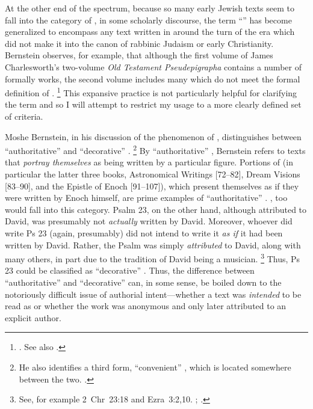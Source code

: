 At the other end of the spectrum, because so many early Jewish texts seem to fall into the category of \psa, in some scholarly discourse, the term ``\psa'' has become generalized to encompass any text written in around the turn of the era which did not make it into the canon of rabbinic Judaism or early Christianity. Bernstein observes, for example, that although the first volume of James Charlesworth's two-volume \emph{Old Testament Pseudepigrapha} contains a number of formally \psgraphic works, the second volume includes many which do not meet the formal definition of \psa.%
    \footnote{\Cite[2]{bernstein_chazon-etal1999}. See also .}
This expansive practice is not particularly helpful for clarifying the term and so I will attempt to restrict my usage to a more clearly defined set of criteria.

Moshe Bernstein, in his discussion of the phenomenon of \psy, distinguishes between ``authoritative'' \psy and ``decorative'' \psy.%
    \footnote{He also identifies a third form, ``convenient'' \psy, which is located somewhere between the two. \cite[3--7]{bernstein_chazon-etal1999}.}
By ``authoritative'' \psy, Bernstein refers to texts that \emph{portray themselves} as being written by a particular figure. Portions of \firstenoch (in particular the latter three books, Astronomical Writings [72--82], Dream Visions [83--90], and the Epistle of Enoch [91--107]), which present themselves as if they were written by Enoch himself, are prime examples of ``authoritative'' \psy. \GA, too would fall into this category. Psalm 23, on the other hand, although attributed to David, was presumably not \emph{actually} written by David. Moreover, whoever did write Ps 23 (again, presumably) did not intend to write it \emph{as if} it had been written by David. Rather, the Psalm was simply \emph{attributed} to David, along with many others, in part due to the tradition of David being a musician.%
    \footnote{See, for example 2~Chr~23:18 and Ezra~3:2,10. \cite{mays_interpretation1986}; \cite{sarna_stein-loewe1979}.}
Thus, Ps 23 could be classified as ``decorative'' \psy. Thus, the difference between ``authoritative'' and ``decorative'' \psy can, in some sense, be boiled down to the notoriously difficult issue of authorial intent---whether a text was \emph{intended} to be read as \psa or whether the work was anonymous and only later attributed to an explicit author.

